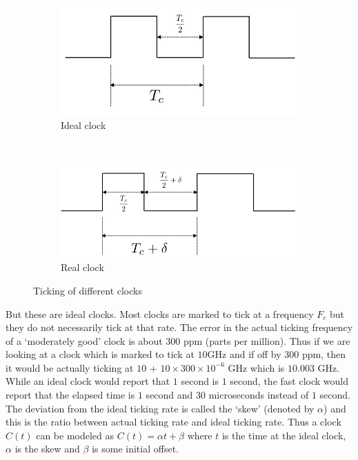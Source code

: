 \documentclass[10pt, journal, letter, onecolumn]{IEEEtran}
\begin{document}
\begin{figure}[htb]
\begin{subfigure}[b]{0.45\textwidth}
\centering
\includegraphics[width = \textwidth]{figures/ideal_clock}
\caption{Ideal clock}
\label{fig:clock_ideal}
\end{subfigure}
~\begin{subfigure}[b]{0.54\textwidth}
\centering
\includegraphics[width = \textwidth]{figures/real_clock}
\caption{Real clock}
\label{fig:clock_real}
\end{subfigure}
\caption{Ticking of different clocks}
\end{figure}

But these are ideal clocks. Most clocks are marked to tick at a frequency $F_c$ but they do not necessarily tick at that rate. The error in the actual ticking frequency of a `moderately good' clock is about $300$ ppm (parts per million). Thus if we are looking at a clock which is marked to tick at $10$GHz and if off by $300$ ppm, then it would be actually ticking at $10$ + $10 \times 300 \times 10^{-6}$ GHz which is $10.003$ GHz. While an ideal clock would report that $1$ second is $1$ second, the fast clock would report that the elapsed time is $1$ second and $30$ microseconds instead of $1$ second. The deviation from the ideal ticking rate is called the `skew' (denoted by $\alpha$) and this is the ratio between actual ticking rate and ideal ticking rate. Thus a clock $C(t)$ can be modeled as $C(t) = \alpha t + \beta$ where $t$ is the time at the ideal clock, $\alpha$ is the skew and $\beta$ is some initial offset.
\end{document}
